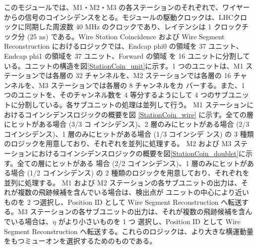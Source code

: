 このモジュールでは、M1・M2・M3 の各ステーションのそれぞれで、ワイヤーからの信号のコインシデンスをとる。モジュールの駆動クロックは、LHCクロックに同期した周波数 40 MHz のクロックであり、レイテンシは 1 クロックチック分 (25 ns) である。Wire Station Coincidence および Wire Segment Reconstruction におけるロジックでは、Endcap phi0 の領域を 37 ユニット、Endcap phi1 の領域を 37 ユニット、Forward の領域 を 16 ユニットに分割している。ユニットの構造を図\ref{StationCoin_unit}に示す。1 つのユニットは、M1 ステーションでは各層の 32 チャンネルを、M2 ステーションでは各層の 16 チャンネルを、M3 ステーションでは各層の 8 チャンネルをカ バーする。また、1 つのユニットを、そのチャンネル数を 4 等分するようにして 4 つのサブユニットに分割している。各サブユニットの処理は並列して行う。
M1 ステーションにおけるコインシデンスロジックの概要を図 \ref{StationCoin_wire} に示す。全ての層にヒットがある場合 (3/3 コ インシデンス)、2 層のみにヒットがある場合 (2/3 コインシデンス)、1 層のみにヒットがある場合 (1/3 コインシデ ンス) の 3 種類のロジックを用意しており、それぞれを並列に処理する。
M2 および M3 ステーションにおけるコインシデンスロジックの概要を図\ref{StationCoin_doublet}に示す。全ての層にヒットがある 場合 (2/2 コインシデンス)、1 層のみにヒットがある場合 (1/2 コインシデンス) の 2 種類のロジックを用意しており、それぞれを並列に処理する。
M1 および M2 ステーションの各サブユニットの出力は、それが複数の飛跡候補を含んでいる場合は、検出点が ユニットの中心により近いものを 2 つ選択し、Position ID として Wire Segment Reconstruction へ転送する。M3 ステーションの各サブユニットの出力は、それが複数の飛跡候補を含んでいる場合は、$\eta$ がより小さいものを 1 つ 選択し、Position ID として Wire Segment Reconstruction へ転送する。これらのロジックは、より大きな横運動量 をもつミューオンを選択するためのものである。

